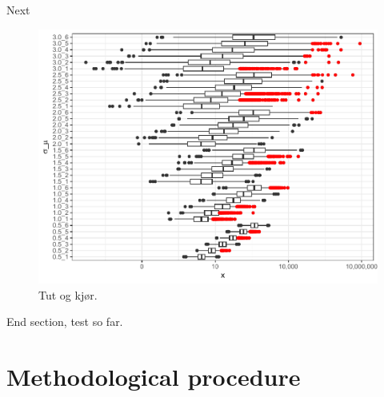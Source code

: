 \documentclass[
  12pt,
]{book}
\begin{document}
Next



\begin{figure}

{\centering \includegraphics[width=0.7\linewidth]{bookdown-demo_files/figure-latex/05-ln-pl-1} 

}

\caption{Tut og kjør.}\label{fig:05-ln-pl}
\end{figure}

End section, test so far.

\FloatBarrier

\hypertarget{methodological-procedure}{%
\section{Methodological procedure}\label{methodological-procedure}}
\end{document}
